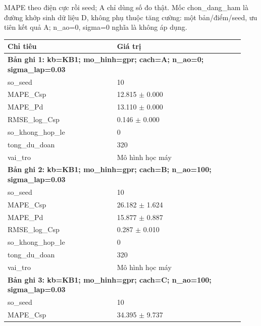 \par\smallskip\noindent MAPE theo điện cực rồi seed; A chỉ dùng số đo thật. Mốc chon\_dang\_ham là đường khớp sinh dữ liệu D, không phụ thuộc tăng cường: một bản/điểm/seed, ưu tiên kết quả A; n\_ao=0, sigma=0 nghĩa là không áp dụng.\par
\begin{longtable}{p{0.43\linewidth}p{0.50\linewidth}}
\toprule Chỉ tiêu & Giá trị \\ \midrule \endhead
\multicolumn{2}{p{0.95\linewidth}}{\textbf{Bản ghi 1: kb=KB1; mo\_hinh=gpr; cach=A; n\_ao=0; sigma\_lap=0.03}} \\
so\_\allowbreak seed & 10 \\
MAPE\_\allowbreak Csp & 12.815 $\pm$ 0.000 \\
MAPE\_\allowbreak Pd & 13.110 $\pm$ 0.000 \\
RMSE\_\allowbreak log\_\allowbreak Csp & 0.146 $\pm$ 0.000 \\
so\_\allowbreak khong\_\allowbreak hop\_\allowbreak le & 0 \\
tong\_\allowbreak du\_\allowbreak doan & 320 \\
vai\_\allowbreak tro & Mô hình học máy \\
\midrule
\multicolumn{2}{p{0.95\linewidth}}{\textbf{Bản ghi 2: kb=KB1; mo\_hinh=gpr; cach=B; n\_ao=100; sigma\_lap=0.03}} \\
so\_\allowbreak seed & 10 \\
MAPE\_\allowbreak Csp & 26.182 $\pm$ 1.624 \\
MAPE\_\allowbreak Pd & 15.877 $\pm$ 0.887 \\
RMSE\_\allowbreak log\_\allowbreak Csp & 0.287 $\pm$ 0.010 \\
so\_\allowbreak khong\_\allowbreak hop\_\allowbreak le & 0 \\
tong\_\allowbreak du\_\allowbreak doan & 320 \\
vai\_\allowbreak tro & Mô hình học máy \\
\midrule
\multicolumn{2}{p{0.95\linewidth}}{\textbf{Bản ghi 3: kb=KB1; mo\_hinh=gpr; cach=C; n\_ao=100; sigma\_lap=0.03}} \\
so\_\allowbreak seed & 10 \\
MAPE\_\allowbreak Csp & 34.395 $\pm$ 9.737 \\

\end{longtable}
